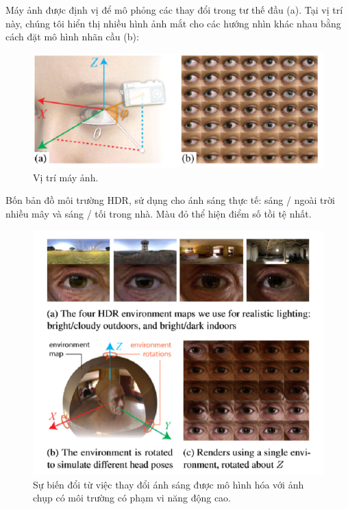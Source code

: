 Máy ảnh được định vị để mô phỏng các thay đổi trong tư thế đầu (a). Tại vị trí này, chúng tôi hiển thị nhiều hình ảnh mắt cho các hướng nhìn khác nhau bằng cách đặt mô hình nhãn cầu (b):
\begin{center}
    \begin{figure}[h!]
    \begin{center}
     \includegraphics[scale=0.75]{img/Camera_position.png}
    \end{center}
    \caption{Vị trí máy ảnh.}
    \label{refhinh20}
    \end{figure}
\end{center}

Bốn bản đồ môi trường HDR, sử dụng cho ánh sáng thực tế: sáng / ngoài trời nhiều mây và sáng / tối trong nhà. Màu đỏ thể hiện điểm số tồi tệ nhất.

\begin{center}
    \begin{figure}[h!]
    \begin{center}
     \includegraphics[scale=0.5]{img/Appearance_variation_from_lighting.png}
    \end{center}
    \caption{Sự biến đổi từ việc thay đổi ánh sáng được mô hình hóa với ảnh chụp có môi trường có phạm vi năng động cao.}
    \label{refhinh20}
    \end{figure}
\end{center}

